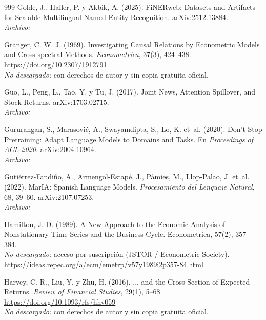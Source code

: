 \begin{thebibliography}{999}
Golde, J., Haller, P. y Akbik, A. (2025). {FiNERweb}: Datasets and Artifacts for Scalable Multilingual Named Entity Recognition. arXiv:2512.13884.
\\\textit{Archivo:} 

Granger, C. W. J. (1969). Investigating Causal Relations by Econometric Models and Cross-spectral Methods. \emph{Econometrica}, 37(3), 424--438. \url{https://doi.org/10.2307/1912791}
\\\textit{No descargado:} con derechos de autor y sin copia gratuita oficial.

Guo, L., Peng, L., Tao, Y. y Tu, J. (2017). Joint News, Attention Spillover, and Stock Returns. arXiv:1703.02715.
\\\textit{Archivo:} 

Gururangan, S., Marasovi{\'c}, A., Swayamdipta, S., Lo, K. et~al. (2020). Don't Stop Pretraining: Adapt Language Models to Domains and Tasks. En \emph{Proceedings of ACL 2020}. arXiv:2004.10964.
\\\textit{Archivo:} 

Guti{\'e}rrez-Fandi{\~n}o, A., Armengol-Estap{\'e}, J., P{\`a}mies, M., Llop-Palao, J. et~al. (2022). {MarIA}: Spanish Language Models. \emph{Procesamiento del Lenguaje Natural}, 68, 39--60. arXiv:2107.07253.
\\\textit{Archivo:} 

Hamilton, J. D. (1989). A New Approach to the Economic Analysis of Nonstationary Time Series and the Business Cycle. Econometrica, 57(2), 357–384.
\\\textit{No descargado:} acceso por suscripción (JSTOR / Econometric Society). \url{https://ideas.repec.org/a/ecm/emetrp/v57y1989i2p357-84.html}

Harvey, C. R., Liu, Y. y Zhu, H. (2016). ... and the Cross-Section of Expected Returns. \emph{Review of Financial Studies}, 29(1), 5--68. \url{https://doi.org/10.1093/rfs/hhv059}
\\\textit{No descargado:} con derechos de autor y sin copia gratuita oficial.


\end{thebibliography}
